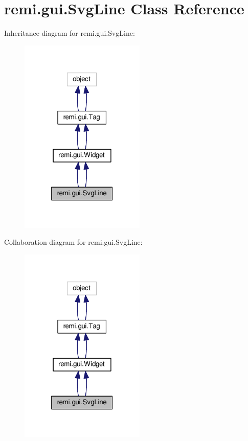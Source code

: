 \hypertarget{classremi_1_1gui_1_1SvgLine}{}\section{remi.\+gui.\+Svg\+Line Class Reference}
\label{classremi_1_1gui_1_1SvgLine}


Inheritance diagram for remi.\+gui.\+Svg\+Line\+:
\nopagebreak
\begin{figure}[H]
\begin{center}
\leavevmode
\includegraphics[width=169pt]{d4/d23/classremi_1_1gui_1_1SvgLine__inherit__graph}
\end{center}
\end{figure}


Collaboration diagram for remi.\+gui.\+Svg\+Line\+:
\nopagebreak
\begin{figure}[H]
\begin{center}
\leavevmode
\includegraphics[width=169pt]{df/db7/classremi_1_1gui_1_1SvgLine__coll__graph}
\end{center}
\end{figure}
